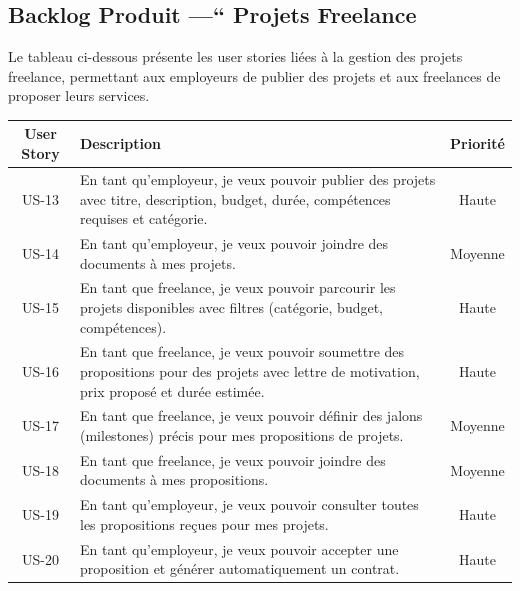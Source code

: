 \subsection{Backlog Produit —“ Projets Freelance}
Le tableau ci-dessous présente les user stories liées à la gestion des projets freelance, permettant aux employeurs de publier des projets et aux freelances de proposer leurs services.

\begin{table}[H]
\centering
\begin{tabularx}{\textwidth}{|c|X|c|}
\hline
\textbf{User Story} & \textbf{Description} & \textbf{Priorité} \\
\hline
US-13 & En tant qu'employeur, je veux pouvoir publier des projets avec titre, description, budget, durée, compétences requises et catégorie. & Haute \\
\hline
US-14 & En tant qu'employeur, je veux pouvoir joindre des documents à mes projets. & Moyenne \\
\hline
US-15 & En tant que freelance, je veux pouvoir parcourir les projets disponibles avec filtres (catégorie, budget, compétences). & Haute \\
\hline
US-16 & En tant que freelance, je veux pouvoir soumettre des propositions pour des projets avec lettre de motivation, prix proposé et durée estimée. & Haute \\
\hline
US-17 & En tant que freelance, je veux pouvoir définir des jalons (milestones) précis pour mes propositions de projets. & Moyenne \\
\hline
US-18 & En tant que freelance, je veux pouvoir joindre des documents à mes propositions. & Moyenne \\
\hline
US-19 & En tant qu'employeur, je veux pouvoir consulter toutes les propositions reçues pour mes projets. & Haute \\
\hline
US-20 & En tant qu'employeur, je veux pouvoir accepter une proposition et générer automatiquement un contrat. & Haute \\
\hline
\end{tabularx}
\end{table}
